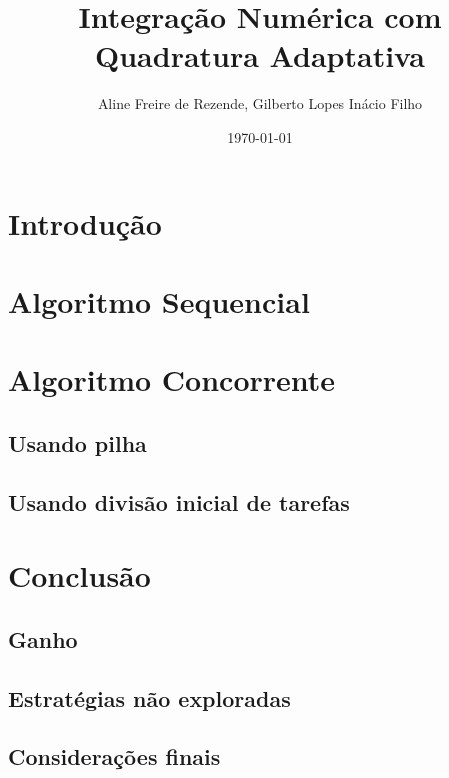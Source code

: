 \documentclass[11pt]{article}
\author{Aline Freire de Rezende, Gilberto Lopes Inácio Filho}
\date{\today}
\title{Integração Numérica com Quadratura Adaptativa}
\begin{document}
\maketitle
\tableofcontents


\section{Introdução}
\label{sec:orgc96afbb}

\section{Algoritmo Sequencial}
\label{sec:orgccd6902}

\section{Algoritmo Concorrente}
\label{sec:org83e46cc}

\subsection{Usando pilha}
\label{sec:org2960eb5}

\subsection{Usando divisão inicial de tarefas}
\label{sec:org625cdee}

\section{Conclusão}
\label{sec:org586e26b}

\subsection{Ganho}
\label{sec:orgaf86095}

\subsection{Estratégias não exploradas}
\label{sec:orgfc9b15d}

\subsection{Considerações finais}
\label{sec:org0327a8a}
\end{document}
